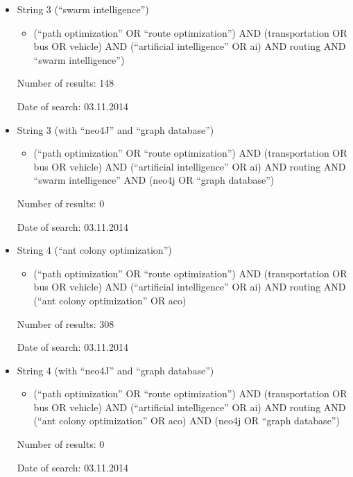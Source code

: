 \begin{itemize}
\item String 3 (``swarm intelligence'')
\begin{itemize}
\item (``path optimization'' OR ``route optimization'') AND (transportation OR bus OR vehicle) AND (``artificial intelligence'' OR ai) AND routing AND ``swarm intelligence'')
\end{itemize}
\par
Number of results: 148
\par
Date of search: 03.11.2014
\end{itemize}
\begin{itemize}
\item String 3 (with ``neo4J'' and ``graph database'')
\begin{itemize}
\item (``path optimization'' OR ``route optimization'') AND (transportation OR bus OR vehicle) AND (``artificial intelligence'' OR ai) AND routing AND ``swarm intelligence'' AND (neo4j OR ``graph database'')
\end{itemize}
\par
Number of results: 0
\par
Date of search: 03.11.2014
\end{itemize}
\begin{itemize}
\item String 4 (``ant colony optimization'')
\begin{itemize}
\item (``path optimization'' OR ``route optimization'') AND (transportation OR bus OR vehicle) AND (``artificial intelligence'' OR ai) AND routing AND (``ant colony optimization'' OR aco)
\end{itemize}
\par
Number of results: 308
\par
Date of search: 03.11.2014
\end{itemize}
\begin{itemize}
\item String 4 (with ``neo4J'' and ``graph database'')
\begin{itemize}
\item (``path optimization'' OR ``route optimization'') AND (transportation OR bus OR vehicle) AND (``artificial intelligence'' OR ai) AND routing AND (``ant colony optimization'' OR aco) AND (neo4j OR ``graph database'')
\end{itemize}
\par
Number of results: 0
\par
Date of search: 03.11.2014
\end{itemize}

